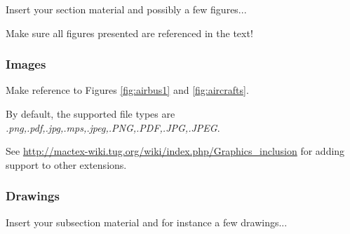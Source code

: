 Insert your section material and possibly a few figures...

Make sure all figures presented are referenced in the text!


\subsubsection{Images}
\label{subsection:images}

\iffalse
\begin{figure}[!htb]
  \centering
  \texttt{[image: Airbus\_A350.jpg]}
  \caption[Caption for figure in TOC.]{Caption for figure.}
  \label{fig:airbus1}
\end{figure}

\begin{figure}[!htb]
  \begin{subfigmatrix}{2}
    \subfigure[Airbus A320]{\texttt{[image: Airbus\_A320\_sharklets.png]}}
    \subfigure[Bombardier CRJ200]{\texttt{[image: Bombardier\_CRJ200.png]}}
  \end{subfigmatrix}
  \caption{Some aircrafts.}
  \label{fig:aircrafts}
\end{figure}
\fi

Make reference to Figures \ref{fig:airbus1} and \ref{fig:aircrafts}.

By default, the supported file types are {\it .png,.pdf,.jpg,.mps,.jpeg,.PNG,.PDF,.JPG,.JPEG}.

See \url{http://mactex-wiki.tug.org/wiki/index.php/Graphics_inclusion} for adding support to other extensions.


\subsubsection{Drawings}
\label{subsection:drawings}

Insert your subsection material and for instance a few drawings...

